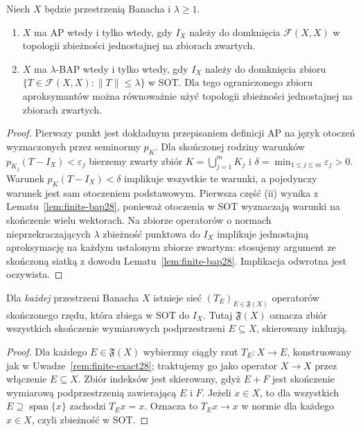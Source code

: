 \begin{twierdzenie}
\label{thm:operator-character-ap28}
Niech $X$ będzie przestrzenią Banacha i $\lambda\ge1$.
\begin{enumerate}[label=\textup{(\roman*)}]
\item $X$ ma AP wtedy i tylko wtedy, gdy
$I_X$ należy do domknięcia $\mathcal F(X,X)$
w topologii zbieżności jednostajnej na zbiorach zwartych.
\item $X$ ma $\lambda$-BAP wtedy i tylko wtedy, gdy
$I_X$ należy do domknięcia zbioru
$\{T\in\mathcal F(X,X):\|T\|\le\lambda\}$ w SOT.
Dla tego ograniczonego zbioru aproksymantów można
równoważnie użyć topologii zbieżności jednostajnej na zbiorach zwartych.
\end{enumerate}
\end{twierdzenie}
\begin{proof}
Pierwszy punkt jest dokładnym przepisaniem definicji AP
na język otoczeń wyznaczonych przez seminormy $p_K$.
Dla skończonej rodziny warunków $p_{K_j}(T-I_X)<\varepsilon_j$
bierzemy zwarty zbiór $K=\bigcup_{j=1}^m K_j$
i $\delta=\min_{1\le j\le m}\varepsilon_j>0$.
Warunek $p_K(T-I_X)<\delta$ implikuje wszystkie te warunki,
a pojedynczy warunek jest sam otoczeniem podstawowym.
Pierwsza część (ii) wynika z Lematu~\ref{lem:finite-bap28},
ponieważ otoczenia w SOT wyznaczają warunki na skończenie
wielu wektorach. Na zbiorze operatorów o normach
nieprzekraczających $\lambda$ zbieżność punktowa do
$I_X$ implikuje jednostajną aproksymację na każdym
ustalonym zbiorze zwartym: stosujemy argument ze
skończoną siatką z dowodu Lematu~\ref{lem:finite-bap28}.
Implikacja odwrotna jest oczywista.
\end{proof}

\begin{stwierdzenie}
\label{prop:universal-sot28}
Dla \emph{każdej} przestrzeni Banacha $X$ istnieje sieć
$(T_E)_{E\in\mathfrak F(X)}$ operatorów skończonego rzędu,
która zbiega w SOT do $I_X$. Tutaj $\mathfrak F(X)$
oznacza zbiór wszystkich skończenie wymiarowych podprzestrzeni
$E\subseteq X$, skierowany inkluzją.
\end{stwierdzenie}
\begin{proof}
Dla każdego $E\in\mathfrak F(X)$ wybierzmy
ciągły rzut $T_E:X\to E$, konstruowany jak
w Uwadze~\ref{rem:finite-exact28}; traktujemy go jako operator
$X\to X$ przez włączenie $E\subseteq X$. Zbiór indeksów
jest skierowany, gdyż $E+F$ jest skończenie wymiarową
podprzestrzenią zawierającą $E$ i $F$.
Jeżeli $x\in X$,
to dla wszystkich $E\supseteq\operatorname{span}\{x\}$
zachodzi $T_Ex=x$. Oznacza to $T_Ex\to x$
w normie dla każdego $x\in X$, czyli zbieżność w SOT.
\end{proof}

